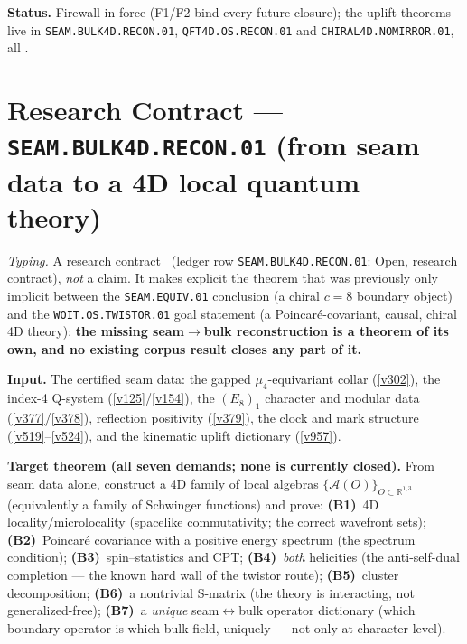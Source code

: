 \par\smallskip\noindent\textbf{Status.} Firewall in force (F1/F2 bind every future closure);
the uplift theorems live in \texttt{SEAM.BULK4D.RECON.01}, \texttt{QFT4D.OS.RECON.01} and
\texttt{CHIRAL4D.NOMIRROR.01}, all \mO.

\section*{Research Contract --- \texttt{SEAM.BULK4D.RECON.01} (from seam data to a 4D local quantum theory)}
\noindent\emph{Typing.} A research contract \mO\ (ledger row \texttt{SEAM.BULK4D.RECON.01}:
Open, research contract), \emph{not} a claim.  It makes explicit the theorem that was previously
only implicit between the \texttt{SEAM.EQUIV.01} conclusion (a chiral $c{=}8$ boundary object)
and the \texttt{WOIT.OS.TWISTOR.01} goal statement (a Poincar\'e-covariant, causal, chiral 4D
theory): \textbf{the missing seam$\to$bulk reconstruction is a theorem of its own, and no
existing corpus result closes any part of it.}

\par\smallskip\noindent\textbf{Input.} The certified seam data: the gapped $\mu_4$-equivariant
collar (\vref{v302}), the index-4 Q-system (\vref{v125}/\vref{v154}), the $(E_8)_1$ character
and modular data (\vref{v377}/\vref{v378}), reflection positivity (\vref{v379}), the clock and
mark structure (\vref{v519}--\vref{v524}), and the kinematic uplift dictionary (\vref{v957}).

\par\smallskip\noindent\textbf{Target theorem (all seven demands; none is currently closed).}
From seam data alone, construct a 4D family of local algebras
$\{\mathcal A(O)\}_{O\subset\mathbb R^{1,3}}$ (equivalently a family of Schwinger functions) and
prove:
\textbf{(B1)}~4D locality/microlocality (spacelike commutativity; the correct wavefront sets);
\textbf{(B2)}~Poincar\'e covariance with a positive energy spectrum (the spectrum condition);
\textbf{(B3)}~spin--statistics and CPT;
\textbf{(B4)}~\emph{both} helicities (the anti-self-dual completion --- the known hard wall of
the twistor route);
\textbf{(B5)}~cluster decomposition;
\textbf{(B6)}~a nontrivial S-matrix (the theory is interacting, not generalized-free);
\textbf{(B7)}~a \emph{unique} seam$\leftrightarrow$bulk operator dictionary (which boundary
operator is which bulk field, uniquely --- not only at character level).

